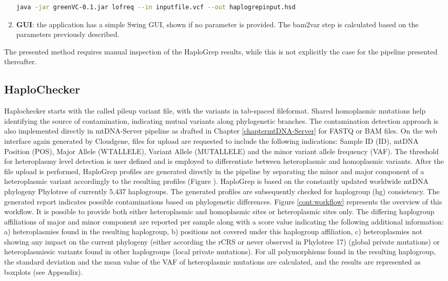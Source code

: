 \begin{enumerate}
\begin{lstlisting}[language=bash]
java -jar greenVC-0.1.jar lofreq --in inputfile.vcf --out haplogrepinput.hsd 
\end{lstlisting}
\item \textbf{GUI}: the application has a simple Swing GUI, shown if no parameter is provided. The bam2var step is calculated based on the parameters previously described.
\end{enumerate}
The presented method requires manual inspection of the HaploGrep results, while this is not explicitly the case for the pipeline presented thereafter. 
\subsection{HaploChecker}\label{cont:haplochecker}
Haplochecker starts with the called pileup variant file, with the variants in tab-spaced fileformat. Shared homoplasmic mutations help identifying the source of contamination, indicating mutual variants along phylogenetic branches. The contamination detection approach is also implemented directly in mtDNA-Server pipeline as drafted in Chapter \ref{chaptermtDNA-Server} for FASTQ or BAM files. On the web interface again generated by Cloudgene, files for upload are requested to include the following indications: Sample ID (ID), mtDNA Position (POS), Major Allele (WTALLELE), Variant Allele (MUTALLELE) and the minor variant allele frequency (VAF). The threshold for heteroplasmy level detection is user defined and is employed to differentiate between heteroplasmic and homoplasmic variants. After the file upload is performed, HaploGrep  profiles are generated directly in the pipeline by separating the minor and major component of a heteroplasmic variant accordingly to the resulting profiles (Figure ). HaploGrep is based on the constantly updated worldwide mtDNA phylogeny Phylotree of currently 5,437 haplogroups. The generated profiles are subsequently checked for haplogroup (hg) consistency. The generated report indicates possible contaminations based on phylogenetic differences. Figure \ref{cont:workflow} represents the overview of this workflow. It is possible to provide both either heteroplasmic and homoplasmic sites or heteroplasmic sites only. The differing haplogroup affiliations of major and minor component are reported per sample along with a score value indicating the following additional information: a) heteroplasmies found in the resulting haplogroup, b) positions not covered under this haplogroup affiliation, c) heteroplasmies not showing any impact on the current phylogeny (either according the rCRS or never observed in Phylotree 17) (global private mutations) or heteroplasmiesic variants found in other haplogroups (local private mutations). For all polymorphisms found in the resulting haplogroup, the standard deviation and the mean value of the VAF of heteroplasmic mutations are calculated, and the results are represented as boxplots (see Appendix). 

